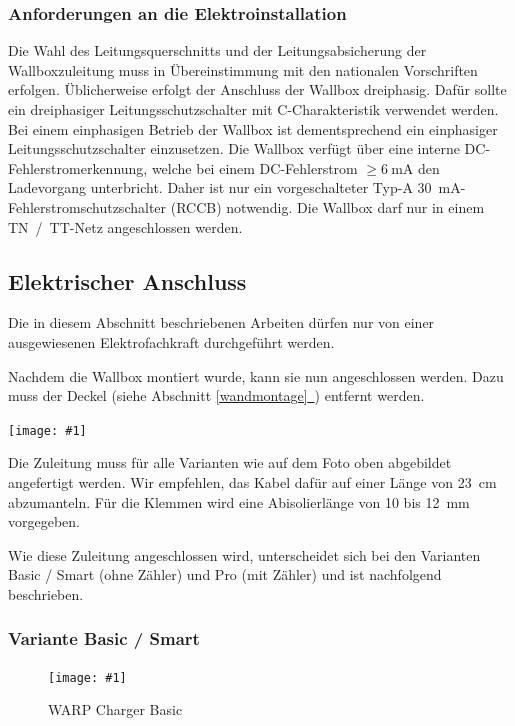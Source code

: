 \documentclass[a4paper,10pt]{article}
\newcommand{\hint}[1]{\begin{tcolorbox}[colback=boxgray,colframe=black,coltext=
white,title=Hinweis,left*=2mm,right*=2mm,boxsep=1mm,bottom=1mm,top=1mm]#1\end{tcolorbox}}
\newcommand{\gfx}[1]{\texttt{[image: \#1]}}
\newcommand*{\fullref}[1]{Abschnitt \hyperref[{#1}]{\ref*{#1}~\nameref*{#1}}}
\begin{document}
\begin{multicols*}{2}
    \subsubsection{Anforderungen an die Elektroinstallation}
    Die Wahl des Leitungsquerschnitts und der Lei\-tungs\-ab\-sicher\-ung der
    Wallboxzuleitung muss in Übereinstimmung mit den nationalen Vorschriften
    erfolgen. Üblicherweise erfolgt der Anschluss der Wallbox dreiphasig.
    Dafür sollte ein dreiphasiger Leitungsschutzschalter mit C-Charakteristik
    verwendet werden. Bei einem einphasigen Betrieb der Wallbox ist
    dementsprechend ein einphasiger Leitungsschutzschalter einzusetzen.
    Die Wallbox verfügt über eine interne DC-Fehlerstromerkennung, welche
    bei einem DC-Fehlerstrom $\geq \SI{6}{\milli\ampere}$ den Ladevorgang
    unterbricht. Daher ist nur ein vorgeschalteter Typ-A \SI{30}{\milli\ampere}-Fehlerstromschutzschalter (RCCB)
    notwendig.
    Die Wallbox darf nur in einem TN~/~TT-Netz angeschlossen werden.

    \newpage
    \subsection{Elektrischer Anschluss}
    \hint{Die in diesem Abschnitt beschriebenen Arbeiten dürfen nur von einer ausgewiesenen
        Elektrofachkraft durchgeführt werden.}

    Nachdem die Wallbox montiert wurde, kann sie nun angeschlossen werden. Dazu
    muss der Deckel (siehe \fullref{wandmontage}) entfernt werden.

    \gfx{./img_warp2/resized/warp_cable_cut_ready}

    Die Zuleitung muss für alle Varianten wie auf dem Foto oben abgebildet
    angefertigt werden. Wir empfehlen, das Kabel dafür auf einer Länge von
    \SI{23}{\centi\meter} abzumanteln. Für die Klemmen wird eine
    Abisolierlänge von 10 bis \SI{12}{\milli\meter} vorgegeben.

    Wie diese Zuleitung angeschlossen wird, unterscheidet sich bei
    den Varianten Basic / Smart (ohne Zähler) und Pro (mit Zähler) und ist
    nachfolgend beschrieben.

    \subsubsection{Variante Basic / Smart}

    \begin{figure}[H]
        \gfx{./img_warp2/resized/warp2_basic_top_open}
        \caption*{WARP Charger Basic}
    \end{figure}


\end{multicols*}
\end{document}
